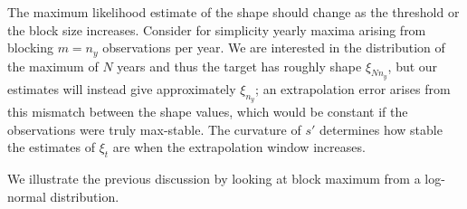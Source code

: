 \documentclass[]{book}
\newenvironment{Shaded}{\begin{snugshade}}{\end{snugshade}}
\newcommand{\DataTypeTok}[1]{\textcolor[rgb]{0.13,0.29,0.53}{#1}}
\newcommand{\DecValTok}[1]{\textcolor[rgb]{0.00,0.00,0.81}{#1}}
\newcommand{\FloatTok}[1]{\textcolor[rgb]{0.00,0.00,0.81}{#1}}
\newcommand{\KeywordTok}[1]{\textcolor[rgb]{0.13,0.29,0.53}{\textbf{#1}}}
\newcommand{\NormalTok}[1]{#1}
\newcommand{\OperatorTok}[1]{\textcolor[rgb]{0.81,0.36,0.00}{\textbf{#1}}}
\newcommand{\OtherTok}[1]{\textcolor[rgb]{0.56,0.35,0.01}{#1}}
\newcommand{\StringTok}[1]{\textcolor[rgb]{0.31,0.60,0.02}{#1}}
\begin{document}
The maximum likelihood estimate of the shape should change as the threshold or the block size increases. Consider for simplicity yearly maxima arising from blocking \(m=n_y\) observations per year. We are interested in the distribution of the maximum of \(N\) years and thus the target has roughly shape \(\xi_{Nn_y}\), but our estimates will instead give approximately \(\xi_{n_y}\); an extrapolation error arises from this mismatch between the shape values, which would be constant if the observations were truly max-stable. The curvature of \(s'\) determines how stable the estimates of \(\xi_t\) are when the extrapolation window increases.

We illustrate the previous discussion by looking at block maximum from a log-normal distribution.

\begin{Shaded}
\end{Shaded}
\end{document}
